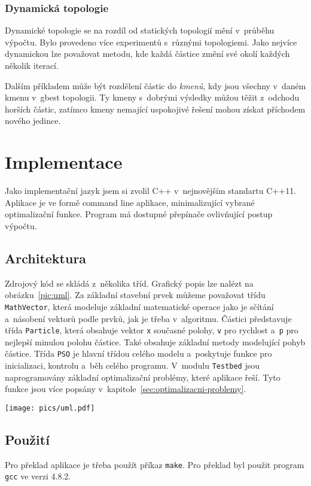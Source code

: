 \documentclass[12pt,a4paper,fleqn]{article}
\begin{document}
\subsubsection{Dynamická topologie}
Dynamické topologie se na rozdíl od statických topologií mění v~průběhu výpočtu.  Bylo provedeno více experimentů s~různými topologiemi. Jako nejvíce dynamickou lze považovat metodu, kde každá částice změní své okolí každých několik iterací. 

Dalším příkladem může být rozdělení částic do \textit{kmenů}, kdy jsou všechny v~daném kmenu v~gbest topologii. Ty kmeny s~dobrými výsledky můžou těžit z~odchodu horších částic, zatímco kmeny nemající uspokojivé řešení mohou získat příchodem nového jedince.

\newpage
\section{Implementace} \label{implementace}
Jako implementační jazyk jsem si zvolil C++ v~nejnovějším standartu C++11. Aplikace je ve formě command line aplikace, minimalizující vybrané optimalizační funkce. Program má dostupné přepínače ovlivňující postup výpočtu.

\subsection{Architektura}
Zdrojový kód se skládá z~několika tříd. Grafický popis lze nalézt na obrázku~\ref{pic:uml}. Za základní stavební prvek můžeme považovat třídu \texttt{MathVector}, která modeluje základní matematické operace jako je sčítání a~násobení vektorů podle prvků, jak je třeba v~algoritmu. Částici představuje třída \texttt{Particle}, která obsahuje vektor \texttt{x} současné polohy, \texttt{v} pro rychlost a~\texttt{p} pro nejlepší minulou polohu částice. Také obsahuje základní metody modelující pohyb částice. Třída \texttt{PSO} je hlavní třídou celého modelu a~poskytuje funkce pro inicializaci, kontrolu a~běh celého programu. V~modulu \texttt{Testbed} jsou naprogramovány základní optimalizační problémy, které aplikace řeší. Tyto funkce jsou více popsány v~kapitole~\ref{sec:optimalizacni-problemy}.
\begin{figure*}[h!]
\centering
\texttt{[image: pics/uml.pdf]}
\caption{UML diagram důležitých částí výsledného programu}
\label{pic:uml}
\end{figure*}

\subsection{Použití}
Pro překlad aplikace je třeba použít příkaz \texttt{make}. Pro překlad byl použit program \texttt{gcc} ve verzi 4.8.2.
\end{document}
